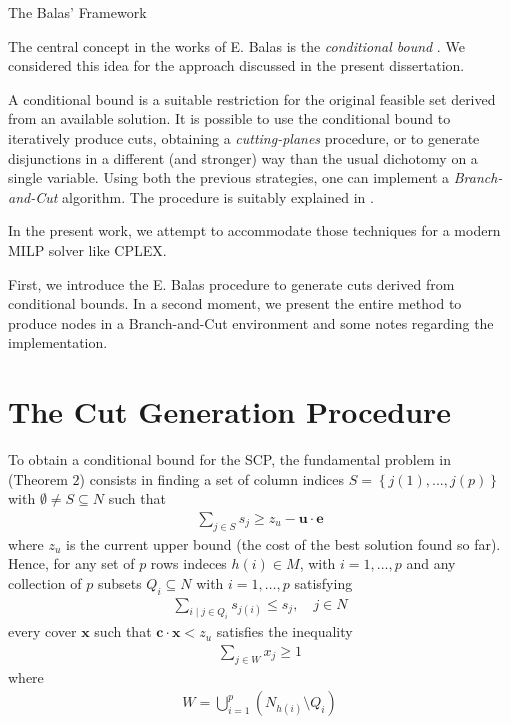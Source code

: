 \documentclass[a4paper,12pt]{mydeitesi_eng}
\begin{document}
\begin{chapter}{The Balas' Framework}
\label{chp:TheBalasFramework}


The central concept in the works of E. Balas is the \emph{conditional bound} \cite{Balas1980-CuttinPlanes}.
We considered this idea for the approach discussed in the present dissertation.

A conditional bound is a suitable restriction for the original feasible set derived from an available solution.
It is possible to use the conditional bound to iteratively produce cuts, obtaining a \emph{cutting-planes} procedure, or to generate disjunctions in a different (and stronger) way than the usual dichotomy on a single variable.
Using both the previous strategies, one can implement a \emph{Branch-and-Cut} algorithm.
The procedure is suitably explained in \cite{Balas1980-Computational}.

In the present work, we attempt to accommodate those techniques for a modern MILP solver like CPLEX.

First, we introduce the E. Balas procedure to generate cuts derived from conditional bounds.
In a second moment, we present the entire method to produce nodes in a Branch-and-Cut environment and some notes regarding the implementation.

\section{The Cut Generation Procedure}
\label{sec:CutGeneration}

To obtain a conditional bound for the SCP, the fundamental problem in \cite{Balas1980-CuttinPlanes} (Theorem $2$) consists in finding a set of column indices $S = \left\{ j(1), ..., j(p) \right\}$ with $\emptyset \neq S \subseteq N$ such that
\begin{align}
\sum_{j\in S} s_j \geq z_u - \mathbf{u \cdot e} 
\end{align}
where $z_u$ is the current upper bound (the cost of the best solution found so far).
Hence, for any set of $p$ rows indeces $h(i) \in M$, with $i=1,\dots,p$ and any collection of $p$ subsets $Q_i \subseteq N$ with $i=1,\dots,p$ satisfying
\begin{align}
\sum_{i\mid j \in Q_i} s_{j(i)} \leq s_j, \quad j \in N
\end{align}
every cover $\mathbf{x}$ such that $\mathbf{c \cdot x} < z_u$ satisfies the inequality 
\begin{align}
\sum_{j\in W} x_j \geq 1
\label{eqn:BalasConstr}
\end{align}
where
\begin{align}
W = \bigcup_{i=1}^p \left( N_{h(i)} \setminus Q_i \right)
\end{align}


\end{chapter}
\end{document}
